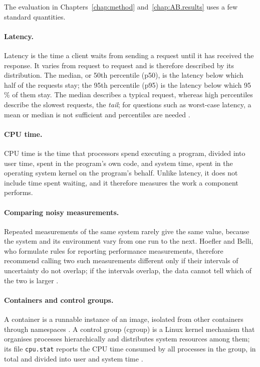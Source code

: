 \documentclass{rptuma}
\begin{document}
The evaluation in Chapters~\ref{chap:method} and~\ref{chap:AB.results} uses a few standard
quantities.

\paragraph{Latency.} Latency is the time a client waits from sending a request until it has
received the response. It varies from request to request and is therefore described by its
distribution. The median, or 50th percentile (p50), is the latency below which half of the
requests stay; the 95th percentile (p95) is the latency below which 95\,\% of them stay. The median
describes a typical request, whereas high percentiles describe the slowest requests, the
\emph{tail}; for questions such as worst-case latency, a mean or median is not sufficient and
percentiles are needed \cite{hoefler2015scientific}.

\paragraph{CPU time.} CPU time is the time that processors spend executing a program, divided into
user time, spent in the program's own code, and system time, spent in the operating system kernel
on the program's behalf. Unlike latency, it does not include time spent waiting, and it therefore
measures the work a component performs.

\paragraph{Comparing noisy measurements.} Repeated measurements of the same system rarely give the
same value, because the system and its environment vary from one run to the next. Hoefler and
Belli, who formulate rules for reporting performance measurements, therefore recommend calling two
such measurements different only if their intervals of uncertainty do not overlap; if the intervals
overlap, the data cannot tell which of the two is larger \cite{hoefler2015scientific}.

\paragraph{Containers and control groups.} A container is a runnable instance of an image, isolated
from other containers through namespaces \cite{docker_overview}. A control group (cgroup) is a Linux
kernel mechanism that organises processes hierarchically and distributes system resources among
them; its file \texttt{cpu.stat} reports the CPU time consumed by all processes in the group, in
total and divided into user and system time \cite{kernel_cgroup2}.
\end{document}
